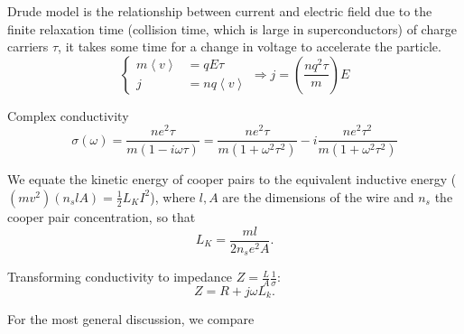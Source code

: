    \begin{framed}\noindent

     Drude  model is  the relationship  between current  and electric
     field due to  the finite relaxation time  (collision time, which
     is large in superconductors) of charge carriers $\tau$, it takes
     some time for a change in voltage to accelerate the particle.
     \begin{equation}
       \left\lbrace
         \begin{aligned}
           m \left\langle v \right\rangle & = qE\tau \\
           j & = nq \left\langle v \right\rangle
         \end{aligned}
       \right.
       \Rightarrow  j = \left(  \frac{nq^2\tau}{m} \right)E
     \end{equation}

     Complex conductivity
     \begin{equation}
       \sigma(\omega) = \frac{ne^2\tau}{m(1 - i\omega\tau)} = \frac{ne^2\tau}{m(1+\omega^2\tau^2)} - i\frac{ne^2\tau^2}{m(1+\omega^2\tau^2)}
     \end{equation}

     \noindent We  equate the kinetic  energy of cooper pairs  to the
     equivalent                    inductive                   energy
     ($(mv^{2})(n_slA)  = \frac{1}{2}L_KI^2$),  where  $l,A$ are  the
     dimensions of the wire and  $n_s$ the cooper pair concentration,
     so that
     \begin{equation}
       L_K = \frac{ml}{2n_se^2A}.
     \end{equation}

     \noindent     Transforming     conductivity     to     impedance
     $Z = \frac{L}{A}\frac{1}{\sigma}$:
     \begin{equation}
       Z = R + j\omega L_k.
     \end{equation}
   \end{framed}

   For the most general discussion, we compare

